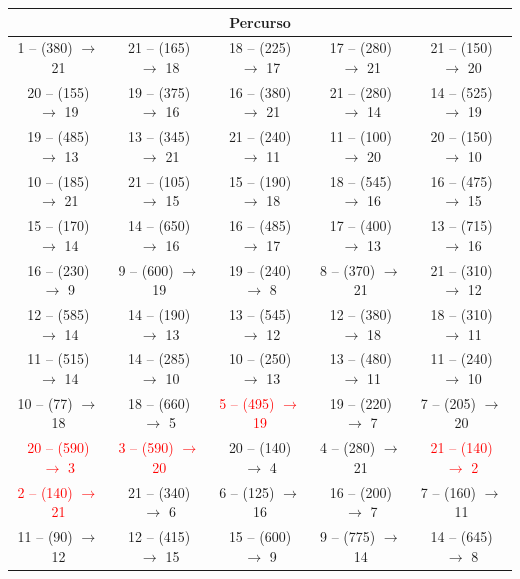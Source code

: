 \begin{table}[H]
    \centering
    \scriptsize
    \begin{tabular}{|c|c|c|c|c|}
        \hline
        \multicolumn{5}{|c|}{Percurso} \\ \hline
    1 -- (380) $\rightarrow$ 21 & 21 -- (165) $\rightarrow$ 18 & 18 -- (225) $\rightarrow$ 17 & 17 -- (280) $\rightarrow$ 21 & 21 -- (150) $\rightarrow$ 20 \\
    20 -- (155) $\rightarrow$ 19 & 19 -- (375) $\rightarrow$ 16 & 16 -- (380) $\rightarrow$ 21 & 21 -- (280) $\rightarrow$ 14 & 14 -- (525) $\rightarrow$ 19 \\
    19 -- (485) $\rightarrow$ 13 & 13 -- (345) $\rightarrow$ 21 & 21 -- (240) $\rightarrow$ 11 & 11 -- (100) $\rightarrow$ 20 & 20 -- (150) $\rightarrow$ 10 \\
    10 -- (185) $\rightarrow$ 21 & 21 -- (105) $\rightarrow$ 15 & 15 -- (190) $\rightarrow$ 18 & 18 -- (545) $\rightarrow$ 16 & 16 -- (475) $\rightarrow$ 15 \\
    15 -- (170) $\rightarrow$ 14 & 14 -- (650) $\rightarrow$ 16 & 16 -- (485) $\rightarrow$ 17 & 17 -- (400) $\rightarrow$ 13 & 13 -- (715) $\rightarrow$ 16 \\
    16 -- (230) $\rightarrow$ 9 & 9 -- (600) $\rightarrow$ 19 & 19 -- (240) $\rightarrow$ 8 & 8 -- (370) $\rightarrow$ 21 & 21 -- (310) $\rightarrow$ 12 \\
    12 -- (585) $\rightarrow$ 14 & 14 -- (190) $\rightarrow$ 13 & 13 -- (545) $\rightarrow$ 12 & 12 -- (380) $\rightarrow$ 18 & 18 -- (310) $\rightarrow$ 11 \\
    11 -- (515) $\rightarrow$ 14 & 14 -- (285) $\rightarrow$ 10 & 10 -- (250) $\rightarrow$ 13 & 13 -- (480) $\rightarrow$ 11 & 11 -- (240) $\rightarrow$ 10 \\
    10 -- (77) $\rightarrow$ 18 & 18 -- (660) $\rightarrow$ 5 & \textcolor{red}{5 -- (495) $\rightarrow$ 19} & 19 -- (220) $\rightarrow$ 7 & 7 -- (205) $\rightarrow$ 20 \\
    \textcolor{red}{20 -- (590) $\rightarrow$ 3} & \textcolor{red}{3 -- (590) $\rightarrow$ 20} & 20 -- (140) $\rightarrow$ 4 & 4 -- (280) $\rightarrow$ 21 & \textcolor{red}{21 -- (140) $\rightarrow$ 2} \\
    \textcolor{red}{2 -- (140) $\rightarrow$ 21} & 21 -- (340) $\rightarrow$ 6 & 6 -- (125) $\rightarrow$ 16 & 16 -- (200) $\rightarrow$ 7 & 7 -- (160) $\rightarrow$ 11 \\
    11 -- (90) $\rightarrow$ 12 & 12 -- (415) $\rightarrow$ 15 & 15 -- (600) $\rightarrow$ 9 & 9 -- (775) $\rightarrow$ 14 & 14 -- (645) $\rightarrow$ 8 \\

\end{tabular}
\end{table}
